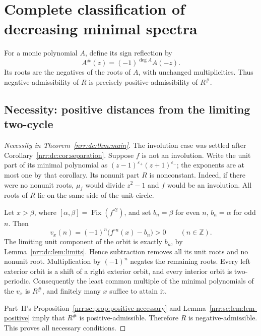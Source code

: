 \documentclass[11pt,letterpaper]{article}
\theoremstyle{definition}
\theoremstyle{remark}
\newcommand{\Z}{\mathbb Z}
\DeclareMathOperator{\Fix}{Fix}
\begin{document}
\section{Complete classification of decreasing minimal spectra}
\label{nrr:dc:sec:classification}

For a monic polynomial $A$, define its sign reflection by
\begin{equation}
 A^\#(z)=(-1)^{\deg A}A(-z).
 \label{nrr:dc:eq:reflection}
\end{equation}
Its roots are the negatives of the roots of $A$, with unchanged
multiplicities. Thus negative-admissibility of $R$ is precisely
positive-admissibility of $R^\#$.

\subsection{Necessity: positive distances from the limiting two-cycle}

\begin{proof}[Necessity in Theorem~\ref{nrr:dc:thm:main}]
The involution case was settled after
Corollary~\ref{nrr:dc:cor:separation}. Suppose $f$ is not an involution.
Write the unit part of its minimal polynomial as
$(z-1)^{\varepsilon_+}(z+1)^{\varepsilon_-}$; the exponents are at most one by
that corollary. Its nonunit part $R$ is nonconstant. Indeed, if
there were no nonunit roots, $\mu_f$ would divide $z^2-1$ and $f$
would be an involution. All roots of $R$ lie on the same side of the
unit circle.

Let $x>\beta$, where $[\alpha,\beta]=\Fix(f^{\circ2})$, and set
$b_n=\beta$ for even $n$, $b_n=\alpha$ for odd $n$. Then
\begin{equation}
 v_x(n)=(-1)^n\bigl(f^{\circ n}(x)-b_n\bigr)>0
 \qquad(n\in\Z).
 \label{nrr:dc:eq:positive-distances}
\end{equation}
The limiting unit component of the orbit is exactly $b_n$, by
Lemma~\ref{nrr:dc:lem:limits}. Hence subtraction removes all its unit roots
and no nonunit root. Multiplication by $(-1)^n$ negates the remaining
roots. Every left exterior orbit is a shift of a right exterior orbit,
and every interior orbit is two-periodic. Consequently the least
common multiple of the minimal polynomials of the $v_x$ is $R^\#$,
and finitely many $x$ suffice to attain it.

Part~II's Proposition~\ref{nrr:sc:prop:positive-necessary} and
Lemma~\ref{nrr:sc:lem:lcm-positive} imply that $R^\#$ is positive-admissible.
Therefore $R$ is negative-admissible. This proves all necessary conditions.
\end{proof}
\end{document}
